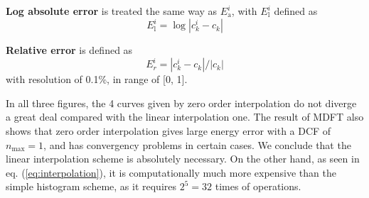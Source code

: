 \textbf{Log absolute error} is treated the same way as $E_{\mathrm{a}}^{i}$,
with $E_{\mathrm{l}}^{i}$ defined as
\begin{equation}
E_{\mathrm{l}}^{i}=\log\left|c_{k}^{i}-c_{k}\right|
\end{equation}


\textbf{Relative error} is defined as
\begin{equation}
E_{r}^{i}=\left|c_{k}^{i}-c_{k}\right|/\left|c_{k}\right|\label{eq:Er}
\end{equation}
with resolution of 0.1\%, in range of {[}0, 1{]}.

In all three figures, the 4 curves given by zero order interpolation
do not diverge a great deal compared with the linear interpolation
one. The result of MDFT also shows that zero order interpolation gives
large energy error with a DCF of $n_{\max}=1$, and has convergency
problems in certain cases. We conclude that the linear interpolation
scheme is absolutely necessary. On the other hand, as seen in eq.
(\ref{eq:interpolation}), it is computationally much more expensive
than the simple histogram scheme, as it requires $2^{5}=32$ times
of operations.
